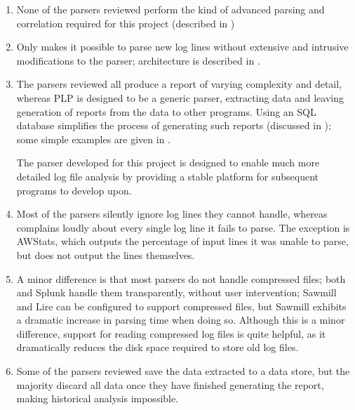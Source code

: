\begin{enumerate}

    \item None of the parsers reviewed perform the kind of advanced parsing
        and correlation required for this project (described in
        )

    \item Only \parsername{} makes it possible to parse new log lines
        without extensive and intrusive modifications to the parser;
        \parsernames{} architecture is described in .

    \item The parsers reviewed all produce a report of varying complexity
        and detail, whereas \gls{PLP} is designed to be a generic parser,
        extracting data and leaving generation of reports from the data to
        other programs.  Using an \gls{SQL} database simplifies the process
        of generating such reports (discussed in ); some simple examples are given in .

        The parser developed for this project is designed to enable much
        more detailed log file analysis by providing a stable platform for
        subsequent programs to develop upon.

    \item Most of the parsers silently ignore log lines they cannot handle,
        whereas \parsername{} complains loudly about every single log line
        it fails to parse.  The exception is AWStats, which outputs the
        percentage of input lines it was unable to parse, but does not
        output the lines themselves.

    \item A minor difference is that most parsers do not handle compressed
        files; both \parsername{} and Splunk handle them transparently,
        without user intervention; Sawmill and Lire can be configured to
        support compressed files, but Sawmill exhibits a dramatic increase
        in parsing time when doing so.  Although this is a minor
        difference, support for reading compressed log files is quite
        helpful, as it dramatically reduces the disk space required to
        store old log files.

    \item Some of the parsers reviewed save the data extracted to a data
        store, but the majority discard all data once they have finished
        generating the report, making historical analysis impossible.

\end{enumerate}

